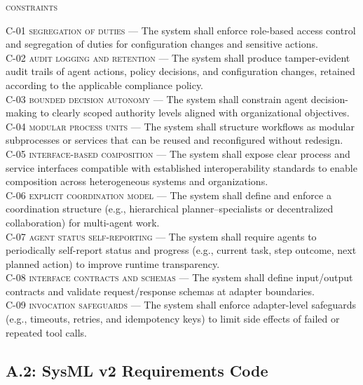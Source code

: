 \noindent \textsc{constraints} \\
\begin{footnotesize}
\noindent \textsc{C-01 segregation of duties} --- The system shall enforce role-based access control and segregation of duties for configuration changes and sensitive actions. \\
\noindent \textsc{C-02 audit logging and retention} --- The system shall produce tamper-evident audit trails of agent actions, policy decisions, and configuration changes, retained according to the applicable compliance policy. \\
\noindent \textsc{C-03 bounded decision autonomy} --- The system shall constrain agent decision-making to clearly scoped authority levels aligned with organizational objectives. \\
\noindent \textsc{C-04 modular process units} --- The system shall structure workflows as modular subprocesses or services that can be reused and reconfigured without redesign. \\
\noindent \textsc{C-05 interface-based composition} --- The system shall expose clear process and service interfaces compatible with established interoperability standards to enable composition across heterogeneous systems and organizations. \\
\noindent \textsc{C-06 explicit coordination model} --- The system shall define and enforce a coordination structure (e.g., hierarchical planner–specialists or decentralized collaboration) for multi-agent work. \\
\noindent \textsc{C-07 agent status self-reporting} --- The system shall require agents to periodically self-report status and progress (e.g., current task, step outcome, next planned action) to improve runtime transparency. \\
\noindent \textsc{C-08 interface contracts and schemas} --- The system shall define input/output contracts and validate request/response schemas at adapter boundaries. \\
\noindent \textsc{C-09 invocation safeguards} --- The system shall enforce adapter-level safeguards (e.g., timeouts, retries, and idempotency keys) to limit side effects of failed or repeated tool calls.
\end{footnotesize}

\subsection*{A.2: SysML v2 Requirements Code}

